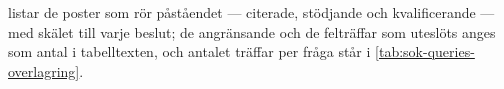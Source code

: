  listar de poster som rör påståendet ---
citerade, stödjande och kvalificerande --- med skälet till varje beslut;
de angränsande och de felträffar som uteslöts anges som antal i
tabelltexten, och antalet träffar per fråga står i
\cref{tab:sok-queries-overlagring}.


